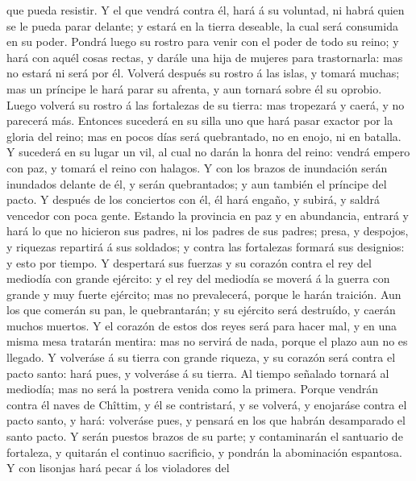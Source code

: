 que pueda resistir.  Y el que vendrá contra él, hará á su
voluntad, ni habrá quien se le pueda parar delante; y estará en la
tierra deseable, la cual será consumida en su poder. 
Pondrá luego su rostro para venir con el poder de todo su reino; y hará
con aquél cosas rectas, y darále una hija de mujeres para trastornarla:
mas no estará ni será por él.  Volverá después su rostro á
las islas, y tomará muchas; mas un príncipe le hará parar su afrenta, y
aun tornará sobre él su oprobio.  Luego volverá su rostro á
las fortalezas de su tierra: mas tropezará y caerá, y no parecerá más.
 Entonces sucederá en su silla uno que hará pasar exactor
por la gloria del reino; mas en pocos días será quebrantado, no en
enojo, ni en batalla.  Y sucederá en su lugar un vil, al
cual no darán la honra del reino: vendrá empero con paz, y tomará el
reino con halagos.  Y con los brazos de inundación serán
inundados delante de él, y serán quebrantados; y aun también el príncipe
del pacto.  Y después de los conciertos con él, él hará
engaño, y subirá, y saldrá vencedor con poca gente. 
Estando la provincia en paz y en abundancia, entrará y hará lo que no
hicieron sus padres, ni los padres de sus padres; presa, y despojos, y
riquezas repartirá á sus soldados; y contra las fortalezas formará sus
designios: y esto por tiempo.  Y despertará sus fuerzas y
su corazón contra el rey del mediodía con grande ejército: y el rey del
mediodía se moverá á la guerra con grande y muy fuerte ejército; mas no
prevalecerá, porque le harán traición.  Aun los que comerán
su pan, le quebrantarán; y su ejército será destruído, y caerán muchos
muertos.  Y el corazón de estos dos reyes será para hacer
mal, y en una misma mesa tratarán mentira: mas no servirá de nada,
porque el plazo aun no es llegado.  Y volveráse á su tierra
con grande riqueza, y su corazón será contra el pacto santo: hará pues,
y volveráse á su tierra.  Al tiempo señalado tornará al
mediodía; mas no será la postrera venida como la primera. 
Porque vendrán contra él naves de Chîttim, y él se contristará, y se
volverá, y enojaráse contra el pacto santo, y hará: volveráse pues, y
pensará en los que habrán desamparado el santo pacto.  Y
serán puestos brazos de su parte; y contaminarán el santuario de
fortaleza, y quitarán el continuo sacrificio, y pondrán la abominación
espantosa.  Y con lisonjas hará pecar á los violadores del
